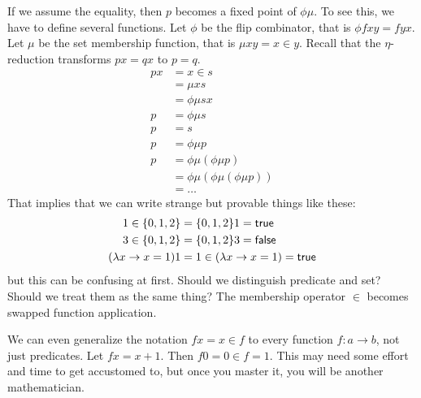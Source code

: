 If we assume the equality, then $p$ becomes a fixed point of $\phi \mu$.
To see this, we have to define several functions.
Let $\phi$ be the flip combinator, that is $\phi f x y = f y x$.
Let $\mu$ be the set membership function, that is $\mu x y = x \in y$.
Recall that the $\eta$-reduction transforms $p x = q x$ to $p = q$.
\begin{align*}
    p x &= x \in s
    \\
    &= \mu x s
    \\
    &= \phi \mu s x
    \\
    p &= \phi \mu s
    \\
    p &= s
    \\
    p &= \phi \mu p
    \\
    p &= \phi \mu (\phi \mu p)
    \\
    &= \phi \mu (\phi \mu (\phi \mu p))
    \\
    &= \ldots
\end{align*}
That implies that we can write strange but provable things like these:
\begin{align*}
    1 \in \{0,1,2\} &= \{0,1,2\} 1 = \textsf{true}
    \\
    3 \in \{0,1,2\} &= \{0,1,2\} 3 = \textsf{false}
    \\
    (\lambda x \to x = 1) 1 &= 1 \in (\lambda x \to x = 1) = \textsf{true}
\end{align*}
but this can be confusing at first.
Should we distinguish predicate and set?
Should we treat them as the same thing?
The membership operator $\in$ becomes swapped function application.

We can even generalize the notation $f x = x \in f$ to every function $f : a \to b$, not just predicates.
Let $f x = x + 1$. Then $f 0 = 0 \in f = 1$.
This may need some effort and time to get accustomed to,
but once you master it, you will be another mathematician.

